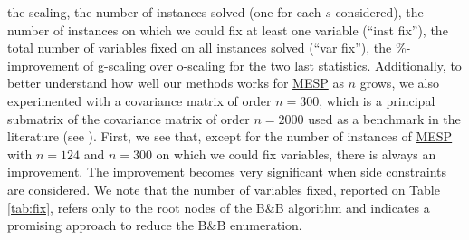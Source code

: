 \documentclass[smallextended]{svjour3hack}       %
\begin{document}
{the scaling, the number of instances solved (one for each $s$ considered), the number of instances on which we could fix at least one variable (``inst fix''), the total number of variables fixed on all instances solved (``var fix''), the \%-improvement of g-scaling over o-scaling for the two last statistics. Additionally, to better understand how well our methods works for \hyperlink{MESP}{MESP} as $n$ grows, we also experimented with a covariance matrix of order $n=300$, which is a principal submatrix of the  covariance matrix of order $n=2000$ used as a benchmark in the literature (see \cite{li2020best,chen2023computing}).   First, we see that, except for the number of instances of  \hyperlink{MESP}{MESP} with $n=124$ and $n=300$ on which we could fix variables,  there is always an improvement. The improvement becomes very significant when side constraints are considered.   We note that the number of variables fixed, reported on Table \ref{tab:fix}, refers only to the root nodes of the B{\&}B algorithm and indicates a promising approach to reduce  the B{\&}B enumeration.


}
\end{document}
